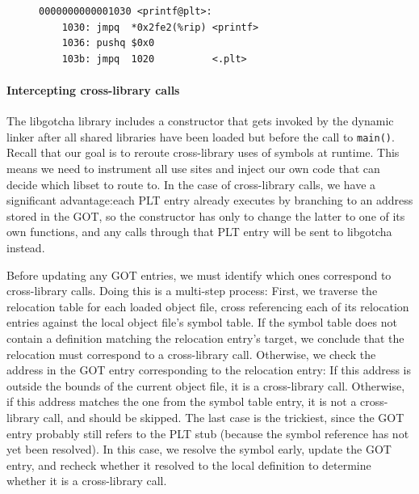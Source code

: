 \begin{figure}
\begin{lstlisting}[label=lst:plt,caption=Example PLT entry for call to \texttt{printf()}]
0000000000001030 <printf@plt>:
	1030: jmpq  *0x2fe2(%rip) <printf>
	1036: pushq $0x0
	103b: jmpq  1020          <.plt>
\end{lstlisting}
\end{figure}

\paragraph{Intercepting cross-library calls}

The libgotcha library includes a constructor that gets invoked by the dynamic linker
after all shared libraries have been loaded but before the call to \texttt{main()}.
Recall that our goal is to reroute cross-library uses of symbols at runtime.  This
means we need to instrument all use sites and inject our own code that can decide
which libset to route to.  In the case of cross-library calls, we have a significant
advantage:\@ each PLT entry already executes by branching to an address stored in the
GOT, so the constructor has only to change the latter to one of its own functions,
and any calls through that PLT entry will be sent to libgotcha instead.

Before updating any GOT entries, we must identify
which ones correspond to cross-library calls.  Doing this is a multi-step process:
First, we traverse the relocation table for each loaded object file, cross
referencing each of its relocation entries against the local object file's symbol
table.  If the symbol table does not contain a definition matching the relocation
entry's target, we conclude that the relocation must correspond to a cross-library
call.  Otherwise, we check the address in the GOT entry corresponding to the
relocation entry:  If this address is outside the bounds of the current object file,
it is a cross-library call.  Otherwise, if this address matches the one from the
symbol table entry, it is not a cross-library call, and should be skipped.  The last
case is the trickiest, since the GOT entry probably still refers to the PLT stub
(because the symbol reference has not yet been resolved).  In this case, we resolve
the symbol
early, update the GOT entry, and recheck whether it resolved to the local definition
to determine whether it is a cross-library call.

